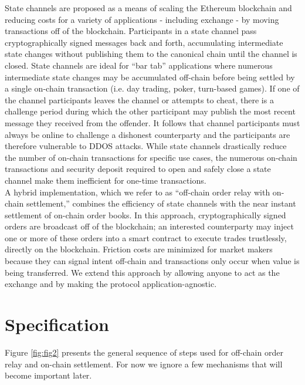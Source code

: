 \documentclass[10pt]{article}
\begin{document}
\noindent State channels are proposed as a means of scaling the Ethereum blockchain and reducing costs for a variety of applications - including exchange\cite{raidex} - by moving transactions off of the blockchain\cite{jcoleman, ledger}. Participants in a state channel pass cryptographically signed messages back and forth, accumulating intermediate state changes without publishing them to the canonical chain until the channel is closed. State channels are ideal for ``bar tab'' applications where numerous intermediate state changes may be accumulated off-chain before being settled by a single on-chain transaction (i.e. day trading, poker, turn-based games).  If one of the channel participants leaves the channel or attempts to cheat, there is a challenge period during which the other participant may publish the most recent message they received from the offender. It follows that channel participants must always be online to challenge a dishonest counterparty and the participants are therefore vulnerable to DDOS attacks. While state channels drastically reduce the number of on-chain transactions for specific use cases, the numerous on-chain transactions and security deposit required to open and safely close a state channel make them inefficient for one-time transactions. \\

\noindent A hybrid implementation, which we refer to as ``off-chain order relay with on-chain settlement,'' combines the efficiency of state channels with the near instant settlement of on-chain order books. In this approach, cryptographically signed orders are broadcast off of the blockchain; an interested counterparty may inject one or more of these orders into a smart contract to execute trades trustlessly, directly on the blockchain\cite{idex, etherdelta}. Friction costs are minimized for market makers because they can signal intent off-chain and transactions only occur when value is being transferred. We extend this approach by allowing anyone to act as the exchange and by making the protocol application-agnostic. \\

\clearpage

\pagebreak

\section{Specification}

Figure \ref{fig:fig2} presents the general sequence of steps used for off-chain order relay and on-chain settlement. For now we ignore a few mechanisms that will become important later.
\end{document}
